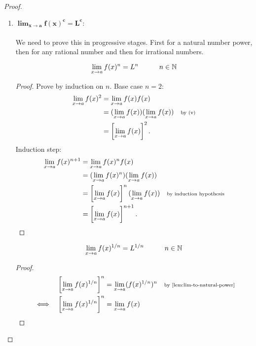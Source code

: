 \documentclass[MathsNotesBase.tex]{subfiles}
\begin{document}
{\begin{proof}
\begin{enumerate}[label=(\roman*)]
{\begin{proof}
					\end{proof}
					\bigskip
					Now we can use (v) to deduce that, 
					\[ \lim_{x \to a} \frac{f(x)}{g(x)} = (\lim_{x \to a} f(x))\left(\lim_{x \to a} \frac{1}{g(x)}\right) = L \cdot \frac{1}{M} = \frac{L}{M}. \]
				}
				\item{${\bm{ \lim_{x \to a} f(x)^c = L^c }}$:\\\\
					We need to prove this in progressive stages. First for a natural number power, then for any rational number and then for irrational numbers.
					\begin{lemma}\label{lem:lim-to-natural-power}
						\[ \lim_{x \to a} f(x)^n = L^n \hspace{30pt} n \in \mathbb{N}^{} \]
					\end{lemma}
					\begin{proof}
						Prove by induction on $n$. Base case ${ n = 2 }$:
						\begin{align*}
						\lim_{x \to a} f(x)^2 &= \lim_{x \to a} f(x)f(x) \\
						&= (\lim_{x \to a} f(x))(\lim_{x \to a} f(x)) &\text{\scriptsize{by (v)}} \\
						&= \left[\lim_{x \to a} f(x)\right]^2.
						\end{align*}
						Induction step:
						\begin{align*}
						\lim_{x \to a} f(x)^{n+1} &= \lim_{x \to a} f(x)^nf(x) \\
						&= (\lim_{x \to a} f(x)^n)(\lim_{x \to a} f(x)) &\text{\scriptsize{}} \\
						&= \left[\lim_{x \to a} f(x)\right]^n(\lim_{x \to a} f(x)) &\text{\scriptsize{by induction hypothesis}} \\
						&= \left[\lim_{x \to a} f(x)\right]^{n+1}. \qedhere
						\end{align*}						
					\end{proof}
					\begin{lemma}\label{lem:limit-of-nth-root-is-nth-root-of-limit}
						\[ \lim_{x \to a} f(x)^{1/n} = L^{1/n} \hspace{30pt} n \in \mathbb{N}^{} \]
					\end{lemma}
					\begin{proof}
						\begin{align*}
						&& \left[\lim_{x \to a} f(x)^{1/n}\right]^n &= \lim_{x \to a} (f(x)^{1/n})^n &\sidecomment{by \autoref{lem:lim-to-natural-power}}\\
						&\iff & \left[\lim_{x \to a} f(x)^{1/n}\right]^n &= \lim_{x \to a} f(x) &\sidecomment{} \\

\end{align*}
\end{proof}}
\end{enumerate}
\end{proof}}
\end{document}
